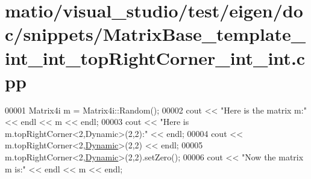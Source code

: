 \hypertarget{matio_2visual__studio_2test_2eigen_2doc_2snippets_2_matrix_base__template__int__int__top_right_corner__int__int_8cpp_source}{}\section{matio/visual\+\_\+studio/test/eigen/doc/snippets/\+Matrix\+Base\+\_\+template\+\_\+int\+\_\+int\+\_\+top\+Right\+Corner\+\_\+int\+\_\+int.cpp}
\label{matio_2visual__studio_2test_2eigen_2doc_2snippets_2_matrix_base__template__int__int__top_right_corner__int__int_8cpp_source}

\begin{DoxyCode}
00001 Matrix4i m = Matrix4i::Random();
00002 cout << \textcolor{stringliteral}{"Here is the matrix m:"} << endl << m << endl;
00003 cout << \textcolor{stringliteral}{"Here is m.topRightCorner<2,Dynamic>(2,2):"} << endl;
00004 cout << m.topRightCorner<2,\hyperlink{namespace_eigen_ad81fa7195215a0ce30017dfac309f0b2}{Dynamic}>(2,2) << endl;
00005 m.topRightCorner<2,\hyperlink{namespace_eigen_ad81fa7195215a0ce30017dfac309f0b2}{Dynamic}>(2,2).setZero();
00006 cout << \textcolor{stringliteral}{"Now the matrix m is:"} << endl << m << endl;
\end{DoxyCode}
